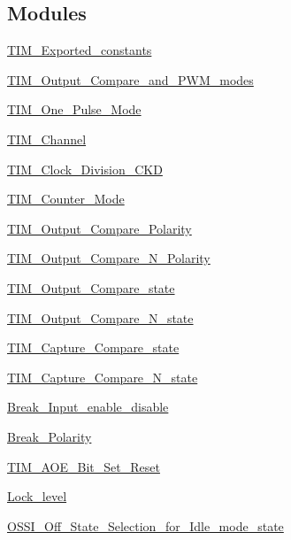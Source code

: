 \subsection*{Modules}
\begin{DoxyCompactItemize}
\item 
\hyperlink{group___t_i_m___exported__constants}{T\+I\+M\+\_\+\+Exported\+\_\+constants}
\item 
\hyperlink{group___t_i_m___output___compare__and___p_w_m__modes}{T\+I\+M\+\_\+\+Output\+\_\+\+Compare\+\_\+and\+\_\+\+P\+W\+M\+\_\+modes}
\item 
\hyperlink{group___t_i_m___one___pulse___mode}{T\+I\+M\+\_\+\+One\+\_\+\+Pulse\+\_\+\+Mode}
\item 
\hyperlink{group___t_i_m___channel}{T\+I\+M\+\_\+\+Channel}
\item 
\hyperlink{group___t_i_m___clock___division___c_k_d}{T\+I\+M\+\_\+\+Clock\+\_\+\+Division\+\_\+\+C\+KD}
\item 
\hyperlink{group___t_i_m___counter___mode}{T\+I\+M\+\_\+\+Counter\+\_\+\+Mode}
\item 
\hyperlink{group___t_i_m___output___compare___polarity}{T\+I\+M\+\_\+\+Output\+\_\+\+Compare\+\_\+\+Polarity}
\item 
\hyperlink{group___t_i_m___output___compare___n___polarity}{T\+I\+M\+\_\+\+Output\+\_\+\+Compare\+\_\+\+N\+\_\+\+Polarity}
\item 
\hyperlink{group___t_i_m___output___compare__state}{T\+I\+M\+\_\+\+Output\+\_\+\+Compare\+\_\+state}
\item 
\hyperlink{group___t_i_m___output___compare___n__state}{T\+I\+M\+\_\+\+Output\+\_\+\+Compare\+\_\+\+N\+\_\+state}
\item 
\hyperlink{group___t_i_m___capture___compare__state}{T\+I\+M\+\_\+\+Capture\+\_\+\+Compare\+\_\+state}
\item 
\hyperlink{group___t_i_m___capture___compare___n__state}{T\+I\+M\+\_\+\+Capture\+\_\+\+Compare\+\_\+\+N\+\_\+state}
\item 
\hyperlink{group___break___input__enable__disable}{Break\+\_\+\+Input\+\_\+enable\+\_\+disable}
\item 
\hyperlink{group___break___polarity}{Break\+\_\+\+Polarity}
\item 
\hyperlink{group___t_i_m___a_o_e___bit___set___reset}{T\+I\+M\+\_\+\+A\+O\+E\+\_\+\+Bit\+\_\+\+Set\+\_\+\+Reset}
\item 
\hyperlink{group___lock__level}{Lock\+\_\+level}
\item 
\hyperlink{group___o_s_s_i___off___state___selection__for___idle__mode__state}{O\+S\+S\+I\+\_\+\+Off\+\_\+\+State\+\_\+\+Selection\+\_\+for\+\_\+\+Idle\+\_\+mode\+\_\+state}

\end{DoxyCompactItemize}
